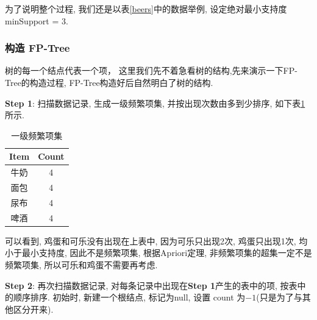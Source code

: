 \documentclass[a4paper,UTF8]{ctexart}
\theoremstyle{plain} \newtheorem{theorem}{定理}[section]
\theoremstyle{plain} \newtheorem{definition}{定义}[section]
\theoremstyle{plain} \newtheorem{lemma}{引理}[section]
\theoremstyle{plain} \newtheorem{proposition}{命题}[section]
\theoremstyle{plain} \newtheorem{example}{例}[section]
\theoremstyle{plain} \newtheorem{remark}{注}[section]
\theoremstyle{plain} \newtheorem{corollary}{推论}[section]
\begin{document}
为了说明整个过程, 我们还是以表\ref{beers}中的数据举例, 设定绝对最小支持度 minSupport = 3.

\subsubsection{构造 FP-Tree}
树的每一个结点代表一个项， 这里我们先不着急看树的结构,先来演示一下FP-Tree的构造过程, FP-Tree构造好后自然明白了树的结构.

\noindent \textbf{Step 1}: 扫描数据记录, 生成一级频繁项集, 并按出现次数由多到少排序, 如下表\ref{step1}所示.
\begin{table}[!htb]
\centering
\caption{一级频繁项集}
\label{step1}
\begin{tabular}{c|c}
	\hline
    \textbf{Item} & \textbf{Count}  \\
    \hline
    牛奶   &  4  \\
    \hline
    面包   &  4  \\
    \hline
    尿布   &  4  \\
    \hline
    啤酒   &  4  \\
	\hline
\end{tabular}
\end{table}

可以看到, 鸡蛋和可乐没有出现在上表中, 因为可乐只出现2次, 鸡蛋只出现1次, 均小于最小支持度, 因此不是频繁项集, 根据Apriori定理, 非频繁项集的超集一定不是频繁项集, 所以可乐和鸡蛋不需要再考虑.


\noindent \textbf{Step 2}: 再次扫描数据记录, 对每条记录中出现在\textbf{Step 1}产生的表中的项, 按表中的顺序排序. 初始时, 新建一个根结点, 标记为null, 设置 count 为$-1$(只是为了与其他区分开来).
\end{document}
